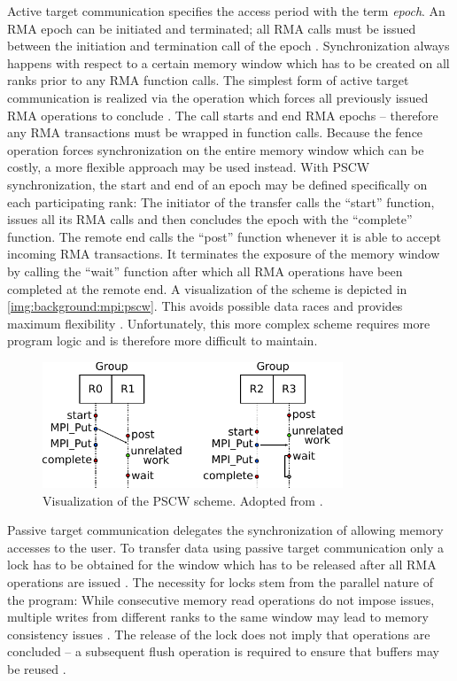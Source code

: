 Active target communication specifies the access period with the term \emph{epoch}. An \ac{RMA} epoch can be initiated and terminated; all \ac{RMA} calls must be issued between the initiation and termination call of the epoch \cite[p.~437]{mpi3-std}. Synchronization always happens with respect to a certain memory window which has to be created on all ranks prior to any \ac{RMA} function calls. The simplest form of active target communication is realized via the  operation which forces all previously issued \ac{RMA} operations to conclude \cite[p.~440\,f]{mpi3-std}. The call starts and end \ac{RMA} epochs -- therefore any \ac{RMA} transactions must be wrapped in  function calls. Because the fence operation forces synchronization on the entire memory window which can be costly, a more flexible approach may be used instead. With \ac{PSCW} synchronization, the start and end of an epoch may be defined specifically on each participating rank: The initiator of the transfer calls the \enquote{start} function, issues all its \ac{RMA} calls and then concludes the epoch with the \enquote{complete} function. The remote end calls the \enquote{post} function whenever it is able to accept incoming \ac{RMA} transactions. It terminates the exposure of the memory window by calling the \enquote{wait} function after which all \ac{RMA} operations have been completed at the remote end. A visualization of the scheme is depicted in \autoref{img:background:mpi:pscw}. This avoids possible data races and provides maximum flexibility \cite[ch.~11.5.2]{mpi3-std}. Unfortunately, this more complex scheme requires more program logic and is therefore more difficult to maintain.

\begin{figure}[htb]
\centering
\includegraphics[width=0.8\textwidth]{img/mpi-pscw}
\caption{Visualization of the \ac{PSCW} scheme. Adopted from \cite{mpi-pscw-img}.}
\label{img:background:mpi:pscw}
\end{figure}

Passive target communication delegates the synchronization of allowing memory accesses to the user. To transfer data using passive target communication only a lock has to be obtained for the window which has to be released after all \ac{RMA} operations are issued \cite[ch.~11.5.3]{mpi3-std}. The necessity for locks stem from the parallel nature of the program: While consecutive memory read operations do not impose issues, multiple writes  from different ranks to the same window may lead to memory consistency issues \cite[ch.~8.4]{mpi-pscw-img}. The release of the lock does not imply that operations are concluded -- a subsequent flush operation is required to ensure that buffers may be reused \cite[ch.~11.5.4]{mpi3-std}.

